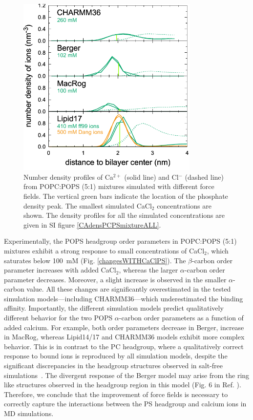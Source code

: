 \documentclass[journal=jpcbfk,manuscript=article]{achemso}
\begin{document}
\begin{figure}[tb]
  \centering
  \includegraphics[width=9cm]{../Figs/CAdensPCPSmixtureLOWconsformatted.pdf}
  \caption{\label{CAdensPCPSmixture}
    Number density profiles of Ca$^{2+}$ (solid line) and Cl$^-$ (dashed line) from POPC:POPS (5:1) mixtures
    simulated with different force fields. The vertical green bars indicate the location of the phosphate density peak.
    The smallest simulated CaCl$_2$ concentrations are shown.
    The density profiles for all the simulated concentrations are given in SI figure \ref{CAdensPCPSmixtureALL}.
  }
\end{figure}


Experimentally, the POPS headgroup order parameters in POPC:POPS (5:1) mixtures
exhibit a strong response to small concentrations of CaCl$_2$, which saturates below 100~mM (Fig. \ref{changesWITHCaClPS}).
The $\beta$-carbon order parameter increases with added CaCl$_2$,
whereas the larger $\alpha$-carbon order parameter decreases. Moreover, a slight increase is observed in
the smaller $\alpha$-carbon value. All these changes are significantly overestimated in the
tested simulation models---including CHARMM36---which underestimated the binding affinity.
Importantly, the different simulation models predict qualitatively different behavior
for the two POPS $\alpha$-carbon order parameters as a function of added calcium.
For example, both order parameters decrease in Berger, increase
in MacRog, whereas Lipid14/17 and CHARMM36 models exhibit more complex behavior.
This is in contrast to the PC headgroup, where a
qualitatively correct response to bound ions is reproduced
by all simulation models, despite the significant discrepancies in the headgroup
structures observed in salt-free simulations~\cite{catte16}.
The divergent response of the Berger model may arise from the ring like structures
observed in the headgroup region in this model (Fig. 6 in Ref. ).
Therefore, we conclude that
the improvement of force fields is necessary to correctly capture the interactions between the
PS headgroup and calcium ions in MD simulations.
\end{document}

